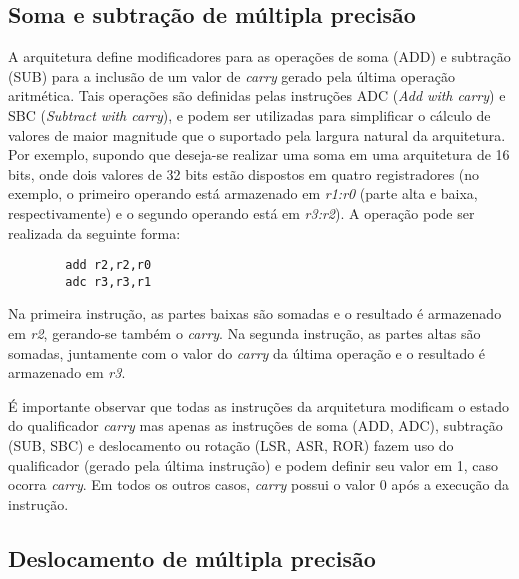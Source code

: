\documentclass{extreport}
\begin{document}
\subsection{Soma e subtração de múltipla precisão}
A arquitetura define modificadores para as operações de soma (ADD) e subtração (SUB) para a inclusão de um valor de \textit{carry} gerado pela última operação aritmética. Tais operações são definidas pelas instruções ADC (\textit{Add with carry}) e SBC (\textit{Subtract with carry}), e podem ser utilizadas para simplificar o cálculo de valores de maior magnitude que o suportado pela largura natural da arquitetura. Por exemplo, supondo que deseja-se realizar uma soma em uma arquitetura de 16 bits, onde dois valores de 32 bits estão dispostos em quatro registradores (no exemplo, o primeiro operando está armazenado em \textit{r1:r0} (parte alta e baixa, respectivamente) e o segundo operando está em \textit{r3:r2}). A operação pode ser realizada da seguinte forma:

\begin{verbatim}
        add r2,r2,r0
        adc r3,r3,r1
\end{verbatim}

Na primeira instrução, as partes baixas são somadas e o resultado é armazenado em \textit{r2}, gerando-se também o \textit{carry}. Na segunda instrução, as partes altas são somadas, juntamente com o valor do \textit{carry} da última operação e o resultado é armazenado em \textit{r3}.

É importante observar que todas as instruções da arquitetura modificam o estado do qualificador \textit{carry} mas apenas as instruções de soma (ADD, ADC), subtração (SUB, SBC) e deslocamento ou rotação (LSR, ASR, ROR) fazem uso do qualificador (gerado pela última instrução) e podem definir seu valor em 1, caso ocorra \textit{carry}. Em todos os outros casos, \textit{carry} possui o valor 0 após a execução da instrução.

\subsection{Deslocamento de múltipla precisão}
\end{document}
